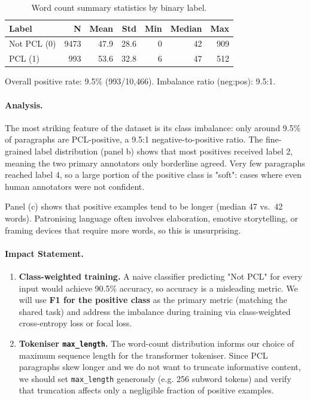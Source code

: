 \documentclass[11pt,a4paper]{article}
\begin{document}
\begin{table}
  \centering
  \caption{Word count summary statistics by binary    
label.}
  \label{tab:eda1-wordcount}
  \begin{tabular}{lrrrrrr}
      \toprule
      \textbf{Label} & \textbf{N} & \textbf{Mean} &   
\textbf{Std} & \textbf{Min} & \textbf{Median} &
\textbf{Max} \\
      \midrule
      Not PCL (0) & 9473 & 47.9 & 28.6 & 0 & 42 & 909 \\
      PCL (1)     &  993 & 53.6 & 32.8 & 6 & 47 & 512 \\
      \bottomrule
  \end{tabular}
  \par\smallskip
  \small Overall positive rate: 9.5\% (993/10{,}466). 
Imbalance ratio (neg:pos): 9.5:1.
\end{table}

\paragraph{Analysis.}

The most striking feature of the dataset is its class imbalance: only around 9.5\% of paragraphs are PCL-positive, a 9.5:1 negative-to-positive ratio. The fine-grained label distribution (panel b) shows that most positives received label 2, meaning the two primary annotators only borderline agreed. Very few paragraphs reached label 4, so a large portion of the positive class is "soft": cases where even human annotators were not confident.

Panel (c) shows that positive examples tend to be longer (median 47 vs.\ 42 words). Patronising language often involves elaboration, emotive storytelling, or framing devices that require more words, so this is unsurprising.

\paragraph{Impact Statement.}

\begin{enumerate}
    \item \textbf{Class-weighted training.} A naive classifier predicting "Not PCL" for every input would achieve 90.5\% accuracy, so accuracy is a misleading metric. We will use \textbf{F1 for the positive class} as the primary metric (matching the shared task) and address the imbalance during training via class-weighted cross-entropy loss or focal loss.
    \item \textbf{Tokeniser \texttt{max\_length}.} The word-count distribution informs our choice of maximum sequence length for the transformer tokeniser. Since PCL paragraphs skew longer and we do not want to truncate informative content, we should set \texttt{max\_length} generously (e.g. 256 subword tokens) and verify that truncation affects only a negligible fraction of positive examples.
\end{enumerate}
\end{document}

